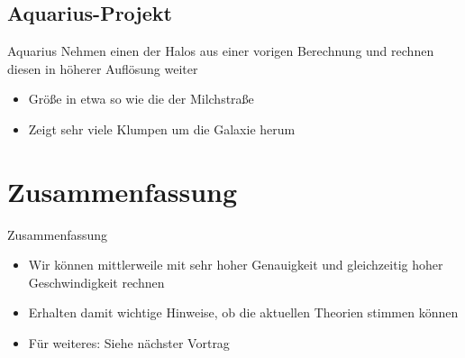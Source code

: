 \documentclass{beamer}
\begin{document}
\subsection*{Aquarius-Projekt}
\begin{frame}{Aquarius}
  Nehmen einen der Halos aus einer vorigen Berechnung und rechnen diesen in
  höherer Auflösung weiter
  \vskip10pt
  \begin{itemize}
    \item Größe in etwa so wie die der Milchstraße
      \vskip10pt
    \item Zeigt sehr viele Klumpen um die Galaxie herum
  \end{itemize}
\end{frame}

\section{Zusammenfassung}
\begin{frame}{Zusammenfassung}
  \begin{itemize}
  \item Wir können mittlerweile mit sehr hoher Genauigkeit und gleichzeitig
    hoher Geschwindigkeit rechnen
  \item Erhalten damit wichtige Hinweise, ob die aktuellen Theorien stimmen
    können
  \item Für weiteres: Siehe nächster Vortrag
  \end{itemize}
\end{frame}
\end{document}
